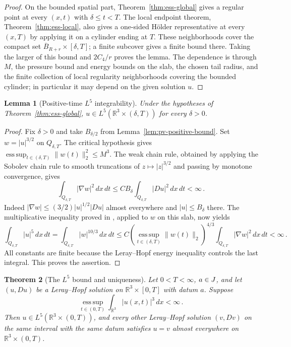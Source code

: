 \documentclass[11pt,letterpaper]{article}
\numberwithin{equation}{section}
\theoremstyle{plain}
\newtheorem{theorem}{Theorem}[section]
\newtheorem{lemma}[theorem]{Lemma}
\theoremstyle{definition}
\theoremstyle{remark}
\begin{document}
\begin{proof}
On the bounded spatial part, Theorem~\ref{thm:ess-global} gives a regular point at every $(x,t)$ with $\delta\le t<T$. The local endpoint theorem, Theorem~\ref{thm:ess-local}, also gives a one-sided H\"older representative at every $(x,T)$ by applying it on a cylinder ending at $T$. These neighborhoods cover the compact set $\overline B_{R+r}\times[\delta,T]$; a finite subcover gives a finite bound there. Taking the larger of this bound and $2C_4/r$ proves the lemma. The dependence is through $M$, the pressure bound and energy bounds on the slab, the chosen tail radius, and the finite collection of local regularity neighborhoods covering the bounded cylinder; in particular it may depend on the given solution $u$.
\end{proof}

\begin{lemma}[Positive-time $L^5$ integrability]\label{lem:pv-positive-l5}
Under the hypotheses of Theorem~\ref{thm:ess-global}, $u\in L^5(\mathbb R^3\times(\delta,T))$ for every $\delta>0$.
\end{lemma}

\begin{proof}
Fix $\delta>0$ and take $B_{\delta/2}$ from Lemma~\ref{lem:pv-positive-bound}. Set $w=|u|^{3/2}$ on $Q_{\delta,T}$. The critical hypothesis gives $\operatorname*{ess\,sup}_{t\in(\delta,T)}\|w(t)\|_2^2\le M^3$. The weak chain rule, obtained by applying the Sobolev chain rule to smooth truncations of $z\mapsto|z|^{3/2}$ and passing by monotone convergence, gives
\begin{equation*}
\int_{Q_{\delta,T}}|\nabla w|^2\,dx\,dt\le C B_\delta\int_{Q_{\delta,T}}|Du|^2\,dx\,dt<\infty\,.
\end{equation*}
Indeed $|\nabla w|\le(3/2)|u|^{1/2}|Du|$ almost everywhere and $|u|\le B_\delta$ there. The multiplicative inequality proved in \cite[Lemma~8.4]{CKNLean}, applied to $w$ on this slab, now yields
\begin{equation*}
\int_{Q_{\delta,T}}|u|^5\,dx\,dt=\int_{Q_{\delta,T}}|w|^{10/3}\,dx\,dt
 \le C\left(\operatorname*{ess\,sup}_{t\in(\delta,T)}\|w(t)\|_2\right)^{4/3}\int_{Q_{\delta,T}}|\nabla w|^2\,dx\,dt<\infty\,.
\end{equation*}
All constants are finite because the Leray--Hopf energy inequality controls the last integral. This proves the assertion.
\end{proof}

\begin{theorem}[The $L^5$ bound and uniqueness]\label{thm:ess-l5-unique}
Let $0<T<\infty$, $a\in J$, and let $(u,Du)$ be a Leray--Hopf solution on $\mathbb R^3\times[0,T]$ with datum $a$. Suppose
\begin{equation*}
\operatorname*{ess\,sup}_{t\in(0,T)}\int_{\mathbb R^3}|u(x,t)|^3\,dx<\infty\,.
\end{equation*}
Then $u\in L^5(\mathbb R^3\times(0,T))$, and every other Leray--Hopf solution $(v,Dv)$ on the same interval with the same datum satisfies $u=v$ almost everywhere on $\mathbb R^3\times(0,T)$.
\end{theorem}
\end{document}
